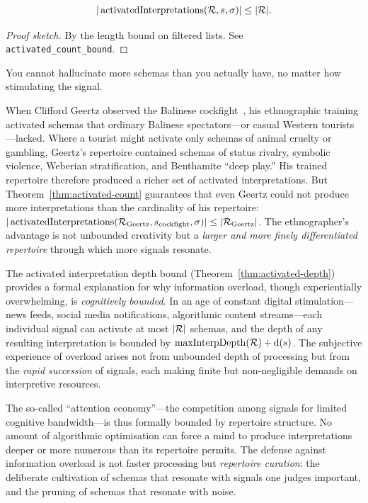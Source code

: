 \begin{theorem}
\label{thm:activated-count}
\[
  |\operatorname{activatedInterpretations}(\mathcal{R}, s, \sigma)|
  \leq |\mathcal{R}|.
\]
\end{theorem}

\begin{proof}[Proof sketch]
By the length bound on filtered lists.
See \texttt{activated\_count\_bound}.
\end{proof}

\begin{remark}
You cannot hallucinate more schemas than you actually have, no matter how
stimulating the signal.
\end{remark}

\begin{example}
\label{ex:ethnographic-attention}
When Clifford Geertz observed the Balinese cockfight~\cite{geertz1973},
his ethnographic training activated schemas that ordinary Balinese
spectators---or casual Western tourists---lacked.  Where a tourist
might activate only schemas of animal cruelty or gambling, Geertz's
repertoire contained schemas of status rivalry, symbolic violence,
Weberian stratification, and Benthamite ``deep play.''  His trained
repertoire therefore produced a richer set of activated
interpretations.  But Theorem~\ref{thm:activated-count} guarantees
that even Geertz could not produce more interpretations than the
cardinality of his repertoire: $|\operatorname{activatedInterpretations}
(\mathcal{R}_{\text{Geertz}}, s_{\text{cockfight}}, \sigma)| \leq
|\mathcal{R}_{\text{Geertz}}|$.  The ethnographer's advantage is not
unbounded creativity but a \emph{larger and more finely differentiated
repertoire} through which more signals resonate.
\end{example}

\begin{remark}
\label{rem:information-overload}
The activated interpretation depth bound
(Theorem~\ref{thm:activated-depth}) provides a formal explanation for
why information overload, though experientially overwhelming, is
\emph{cognitively bounded}.  In an age of constant digital
stimulation---news feeds, social media notifications, algorithmic
content streams---each individual signal can activate at most
$|\mathcal{R}|$ schemas, and the depth of any resulting interpretation is
bounded by $\operatorname{maxInterpDepth}(\mathcal{R}) + \operatorname{d}(s)$.  The
subjective experience of overload arises not from unbounded depth of
processing but from the \emph{rapid succession} of signals, each
making finite but non-negligible demands on interpretive resources.

The so-called ``attention economy''---the competition among signals
for limited cognitive bandwidth---is thus formally bounded by
repertoire structure.  No amount of algorithmic optimisation can force
a mind to produce interpretations deeper or more numerous than its
repertoire permits.  The defense against information overload is not
faster processing but \emph{repertoire curation}: the deliberate
cultivation of schemas that resonate with signals one judges
important, and the pruning of schemas that resonate with noise.
\end{remark}

